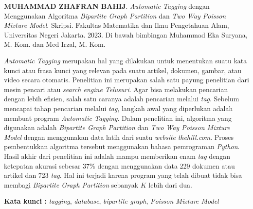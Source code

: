 \documentclass{jtetiskripsi}
\begin{document}
\begin{abstractind}
\textbf{MUHAMMAD ZHAFRAN BAHIJ}. \emph{Automatic Tagging} dengan Menggunakan Algoritma \emph{Bipartite Graph Partition} dan \emph{Two Way Poisson Mixture Model}. Skripsi. Fakultas Matematika dan Ilmu Pengetahuan Alam, Universitas Negeri Jakarta. 2023. Di bawah bimbingan Muhammad Eka Suryana, M. Kom. dan Med Irzal, M. Kom.
\vskip1cm

  \textit{Automatic Tagging} merupakan hal yang dilakukan untuk menentukan
  suatu kata kunci atau frasa kunci yang relevan pada suatu artikel, dokumen, gambar,
  atau video secara otomatis. Penelitian ini merupakan salah satu payung penelitian dari
  mesin pencari atau \textit{search engine Telusuri}. Agar bisa melakukan pencarian dengan lebih efisien, salah satu caranya adalah pencarian melalui \textit{tag}. 
  Sebelum mencapai tahap pencarian melalui \textit{tag},
  langkah awal yang diperlukan adalah membuat program \textit{Automatic Tagging}. Dalam penelitian ini, 
  algoritma yang digunakan adalah \textit{Bipartite Graph Partition} dan \textit{Two Way Poisson Mixture Model} dengan
  menggunakan data latih dari suatu \textit{website} \textit{thehill.com}. Proses pembentukkan algoritma tersebut
  menggunakan bahasa pemrograman \textit{Python}. Hasil akhir dari penelitian ini adalah mampu memberikan enam 
  \textit{tag} dengan ketepatan akurasi sebesar 37\% dengan menggunakan data 229 dokumen atau artikel dan 723 \textit{tag}. 
  Hal ini terjadi karena program yang telah dibuat tidak bisa membagi \textit{Bipartite Graph Partition} sebanyak $K$ lebih dari dua.

  
	\bigskip
	\noindent

	\textbf{Kata kunci :} \textit{tagging}, \textit{database}, \textit{bipartite graph}, \textit{Poisson Mixture Model}
\end{abstractind}
\end{document}
